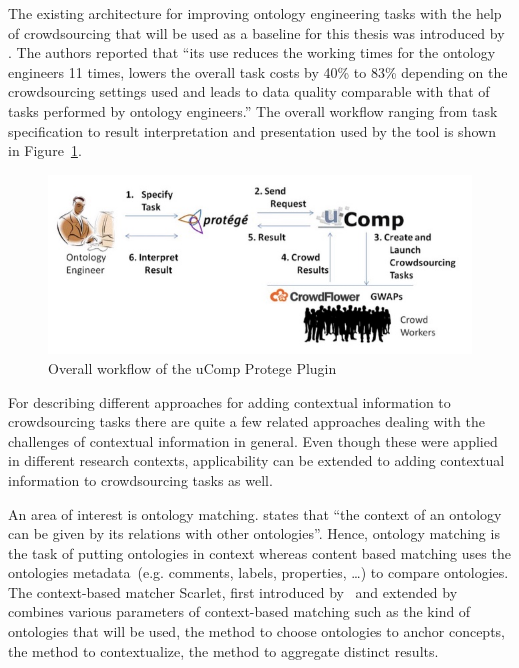 \documentclass[12pt, notitlepage]{article}
\begin{document}
 The existing architecture for improving ontology engineering tasks with the help of crowdsourcing that will be used as a baseline for this thesis was introduced by \citet{wohlgenannt2016crowd}. The authors reported that \enquote{its use reduces the working times for the ontology engineers 11 times, lowers the overall task costs by 40\% to 83\% depending on the crowdsourcing settings used and leads to data quality comparable with that of tasks performed by ontology engineers.} The overall workflow ranging from task specification to result interpretation and presentation used by the tool is shown in Figure~\ref{fig:ucomp_workflow}.
\begin{figure}[H]
	 \includegraphics[width=\textwidth]{graphics/ucomp_workflow}
	 \caption{Overall workflow of the uComp Protege Plugin~\cite{wohlgenannt2016crowd}}\label{fig:ucomp_workflow}
\end{figure}

For describing different approaches for adding contextual information to crowdsourcing tasks there are quite a few related approaches dealing with the challenges of contextual information in general. Even though these were applied in different research contexts, applicability can be extended to adding contextual information to crowdsourcing tasks as well.

An area of interest is ontology matching. \citet{hoffmann2010context} states that \enquote{the context of an ontology can be given by its relations with other ontologies}. Hence, ontology matching is the task of putting ontologies in context whereas content based matching uses the ontologies metadata~(e.g. comments, labels, properties, \ldots) to compare ontologies. The context-based matcher Scarlet, first introduced by~\citet{sabou2008scarlet} and extended by~\citet{hoffmann2010context} combines various parameters of context-based matching such as the kind of ontologies that will be used, the method to choose ontologies to anchor concepts, the method to contextualize, the method to aggregate distinct results. 
\end{document}
